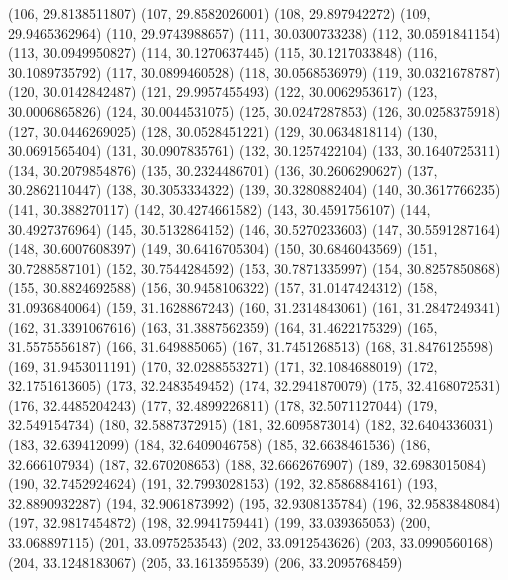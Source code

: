 {					(106, 29.8138511807)
					(107, 29.8582026001)
					(108, 29.897942272)
					(109, 29.9465362964)
					(110, 29.9743988657)
					(111, 30.0300733238)
					(112, 30.0591841154)
					(113, 30.0949950827)
					(114, 30.1270637445)
					(115, 30.1217033848)
					(116, 30.1089735792)
					(117, 30.0899460528)
					(118, 30.0568536979)
					(119, 30.0321678787)
					(120, 30.0142842487)
					(121, 29.9957455493)
					(122, 30.0062953617)
					(123, 30.0006865826)
					(124, 30.0044531075)
					(125, 30.0247287853)
					(126, 30.0258375918)
					(127, 30.0446269025)
					(128, 30.0528451221)
					(129, 30.0634818114)
					(130, 30.0691565404)
					(131, 30.0907835761)
					(132, 30.1257422104)
					(133, 30.1640725311)
					(134, 30.2079854876)
					(135, 30.2324486701)
					(136, 30.2606290627)
					(137, 30.2862110447)
					(138, 30.3053334322)
					(139, 30.3280882404)
					(140, 30.3617766235)
					(141, 30.388270117)
					(142, 30.4274661582)
					(143, 30.4591756107)
					(144, 30.4927376964)
					(145, 30.5132864152)
					(146, 30.5270233603)
					(147, 30.5591287164)
					(148, 30.6007608397)
					(149, 30.6416705304)
					(150, 30.6846043569)
					(151, 30.7288587101)
					(152, 30.7544284592)
					(153, 30.7871335997)
					(154, 30.8257850868)
					(155, 30.8824692588)
					(156, 30.9458106322)
					(157, 31.0147424312)
					(158, 31.0936840064)
					(159, 31.1628867243)
					(160, 31.2314843061)
					(161, 31.2847249341)
					(162, 31.3391067616)
					(163, 31.3887562359)
					(164, 31.4622175329)
					(165, 31.5575556187)
					(166, 31.649885065)
					(167, 31.7451268513)
					(168, 31.8476125598)
					(169, 31.9453011191)
					(170, 32.0288553271)
					(171, 32.1084688019)
					(172, 32.1751613605)
					(173, 32.2483549452)
					(174, 32.2941870079)
					(175, 32.4168072531)
					(176, 32.4485204243)
					(177, 32.4899226811)
					(178, 32.5071127044)
					(179, 32.549154734)
					(180, 32.5887372915)
					(181, 32.6095873014)
					(182, 32.6404336031)
					(183, 32.639412099)
					(184, 32.6409046758)
					(185, 32.6638461536)
					(186, 32.666107934)
					(187, 32.670208653)
					(188, 32.6662676907)
					(189, 32.6983015084)
					(190, 32.7452924624)
					(191, 32.7993028153)
					(192, 32.8586884161)
					(193, 32.8890932287)
					(194, 32.9061873992)
					(195, 32.9308135784)
					(196, 32.9583848084)
					(197, 32.9817454872)
					(198, 32.9941759441)
					(199, 33.039365053)
					(200, 33.068897115)
					(201, 33.0975253543)
					(202, 33.0912543626)
					(203, 33.0990560168)
					(204, 33.1248183067)
					(205, 33.1613595539)
					(206, 33.2095768459)
}

